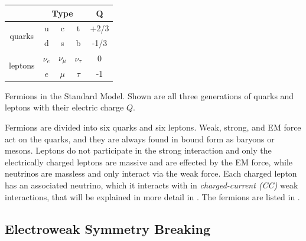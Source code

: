 \begin{margintable}
    \footnotesize
    \begin{tabular}{ ccccc }
    \hline\hline    
     & \multicolumn{3}{c}{\textbf{Type}} & \textbf{Q} \\     
    \hline\hline    
    \multirow{2}{*}[-0.3em]{ quarks } & u & c & t & +2/3 \\
    & d & s & b & -1/3 \\
    \hline
    \multirow{2}{*}[-0.3em]{ leptons } & $\nu_e$ & $\nu_{\mu}$ & $\nu_{\tau}$ & 0 \\
     & $e$ & ${\mu}$ & ${\tau}$ & -1 \\
    \hline
    \end{tabular}
\caption[Standard model fermions]{Fermions in the Standard Model. Shown are all three generations of quarks and leptons with their electric charge $Q$.}
\end{margintable}

Fermions are divided into six quarks and six leptons. Weak, strong, and EM force act on the quarks, and they are always found in bound form as baryons or mesons. Leptons do not participate in the strong interaction and only the electrically charged leptons are massive and are effected by the EM force, while neutrinos are massless and only interact via the weak force. Each charged lepton has an associated neutrino, which it interacts with in \textit{charged-current (CC)} weak interactions, that will be explained in more detail in . The fermions are listed in .


\subsection{Electroweak Symmetry Breaking}

